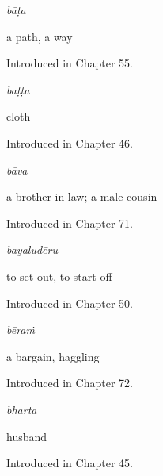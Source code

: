 \noindent\begin{minipage}[t]{\linewidth}
\raggedright
\textbf{}\enspace\emph{bāṭa}\par
\small a path, a way\par
\footnotesize Introduced in Chapter 55.
\end{minipage}\par\medskip

\noindent\begin{minipage}[t]{\linewidth}
\raggedright
\textbf{}\enspace\emph{baṭṭa}\par
\small cloth\par
\footnotesize Introduced in Chapter 46.
\end{minipage}\par\medskip

\noindent\begin{minipage}[t]{\linewidth}
\raggedright
\textbf{}\enspace\emph{bāva}\par
\small a brother-in-law; a male cousin\par
\footnotesize Introduced in Chapter 71.
\end{minipage}\par\medskip

\noindent\begin{minipage}[t]{\linewidth}
\raggedright
\textbf{}\enspace\emph{bayaludēru}\par
\small to set out, to start off\par
\footnotesize Introduced in Chapter 50.
\end{minipage}\par\medskip

\noindent\begin{minipage}[t]{\linewidth}
\raggedright
\textbf{}\enspace\emph{bēraṁ}\par
\small a bargain, haggling\par
\footnotesize Introduced in Chapter 72.
\end{minipage}\par\medskip

\noindent\begin{minipage}[t]{\linewidth}
\raggedright
\textbf{}\enspace\emph{bharta}\par
\small husband\par
\footnotesize Introduced in Chapter 45.
\end{minipage}\par\medskip

